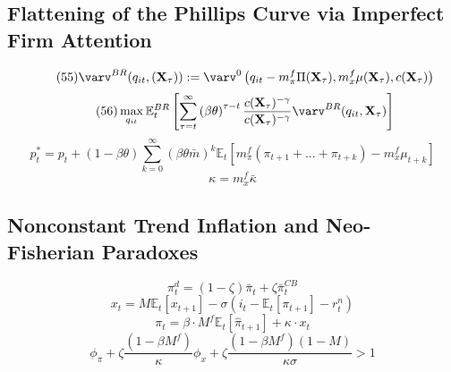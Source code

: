 \documentclass{beamer}
\begin{document}
\subsection{Flattening of the Phillips Curve via Imperfect Firm Attention}
\begin{frame}{\subsecname}
    \begin{equation}\tag{55}
        \varv^{BR}(q_{it},(\textbf{X}_{\tau})):=\varv^{0}\left(q_{it}-m^{f}_{\pi}\Pi(\textbf{X}_{\tau}),m^{f}_{x}\mu(\textbf{X}_{\tau}),c(\textbf{X}_{\tau})\right)
    \end{equation}
    \begin{equation}\tag{56}
        \max_{q_{it}}{\mathbb{E}_{t}^{BR}\left[\sum_{\tau=t}^{\infty}\left(\beta\theta\right)^{\tau-t}\frac{c(\textbf{X}_{\tau})^{-\gamma}}{c(\textbf{X}_{\tau})^{-\gamma}}\varv^{BR}(q_{it},\textbf{X}_{\tau})\right]}
    \end{equation}
    \begin{equation}\tag{57}
        p^{*}_{t}=p_{t}+(1-\beta\theta)\sum^{\infty}_{k=0} \left(\beta\theta\bar{m}\right)^{k}\mathbb{E}_{t}\left[m^{f}_{\pi}(\pi_{t+1}+...+\pi_{t+k})-m^{f}_{x}\mu_{t+k}\right]
    \end{equation}
    \begin{equation}\tag{58}
        \kappa = m^{f}_{x}\bar{\kappa}
    \end{equation}
\end{frame}

\subsection{Nonconstant Trend Inflation and Neo- Fisherian Paradoxes}
\begin{frame}{\subsecname}
    \begin{equation}\tag{59}
        \pi^{d}_{t}=(1-\zeta)\bar{\pi}_{t}+\zeta\bar{\pi}_{t}^{CB}
    \end{equation}
    \begin{equation}\tag{60}
        x_{t}=M\mathbb{E}_{t}\left[x_{t+1}\right]-\sigma\left(i_{t}-\mathbb{E}_{t}\left[\pi_{t+1}\right]-r^{n}_{t}\right)
    \end{equation}
    \begin{equation}\tag{61}
        \pi_{t}=\beta\cdot M^{f} \mathbb{E}_t\left[\hat{\pi}_{t+1}\right]+\kappa\cdot x_{t}
    \end{equation}
    \begin{equation}\tag{62}
        \phi_{\pi}+\zeta \frac{(1-\beta M^{f})}{\kappa}\phi_{x}+\zeta\frac{(1-\beta M^{f})(1-M)}{\kappa \sigma}>1
    \end{equation}
\end{frame}
\end{document}
